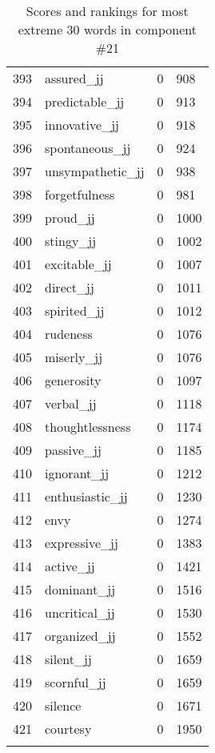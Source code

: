 \begin{longtable}[!htbp]{| rlr@{.}l |}
    393 & assured\_jj & 0 & 908 \\
    394 & predictable\_jj & 0 & 913 \\
    395 & innovative\_jj & 0 & 918 \\
    396 & spontaneous\_jj & 0 & 924 \\
    397 & unsympathetic\_jj & 0 & 938 \\
    398 & forgetfulness & 0 & 981 \\
    399 & proud\_jj & 0 & 1000 \\
    400 & stingy\_jj & 0 & 1002 \\
    401 & excitable\_jj & 0 & 1007 \\
    402 & direct\_jj & 0 & 1011 \\
    403 & spirited\_jj & 0 & 1012 \\
    404 & rudeness & 0 & 1076 \\
    405 & miserly\_jj & 0 & 1076 \\
    406 & generosity & 0 & 1097 \\
    407 & verbal\_jj & 0 & 1118 \\
    408 & thoughtlessness & 0 & 1174 \\
    409 & passive\_jj & 0 & 1185 \\
    410 & ignorant\_jj & 0 & 1212 \\
    411 & enthusiastic\_jj & 0 & 1230 \\
    412 & envy & 0 & 1274 \\
    413 & expressive\_jj & 0 & 1383 \\
    414 & active\_jj & 0 & 1421 \\
    415 & dominant\_jj & 0 & 1516 \\
    416 & uncritical\_jj & 0 & 1530 \\
    417 & organized\_jj & 0 & 1552 \\
    418 & silent\_jj & 0 & 1659 \\
    419 & scornful\_jj & 0 & 1659 \\
    420 & silence & 0 & 1671 \\
    421 & courtesy & 0 & 1950 \\
    \hline
    \caption{Scores and rankings for most extreme 30 words in component \#21} \\
\end{longtable}
